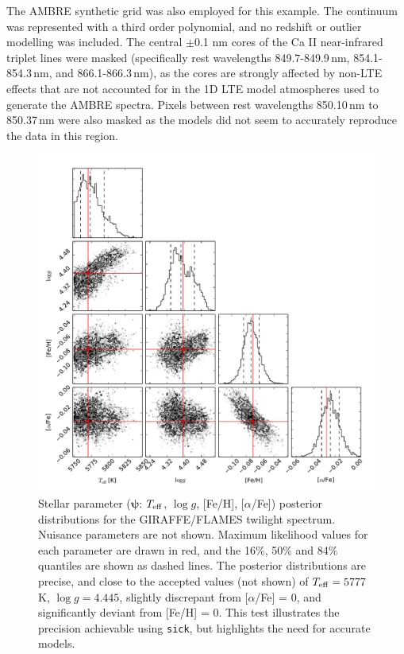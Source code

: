 \documentclass[iop]{emulateapj}
\newcommand{\sick}{\texttt{sick}}
\begin{document}
The AMBRE \citep{ambre} synthetic grid was also employed for this example. The 
continuum was represented with a third order polynomial, and no redshift or 
outlier modelling was included. The central $\pm$0.1 nm cores of the Ca II 
near-infrared triplet lines were masked (specifically rest wavelengths 
849.7-849.9\,nm, 854.1-854.3\,nm, and 866.1-866.3\,nm), as the cores are strongly 
affected by non-LTE effects that are not accounted for in the 1D LTE model atmospheres 
used to generate the AMBRE spectra. Pixels between rest wavelengths 850.10\,nm 
to 850.37\,nm were also masked as the models did not seem to accurately reproduce 
the data in this region. 

\begin{figure}
\label{fig:solar}
\includegraphics[width=\textwidth,height=\textwidth]{solar.pdf}
\caption{Stellar parameter ($\bm{\psi}$: $T_{\rm eff}$, $\log{g}$, [Fe/H], 
[$\alpha$/Fe])  posterior distributions for the GIRAFFE/FLAMES twilight spectrum. 
Nuisance parameters are not shown. Maximum likelihood values for each parameter 
are drawn in red, and the 16\%, 50\% and 84\% quantiles are shown as dashed lines. 
The posterior distributions are precise, and close to the accepted values (not 
shown) of $T_{\rm eff} = 5777$\,K, $\log{g} = 4.445$, slightly discrepant from 
[$\alpha$/Fe] = 0, and significantly deviant from [Fe/H] = 0. This test 
illustrates the precision achievable using \sick, but highlights the need for 
accurate models.}
\end{figure}
\end{document}
